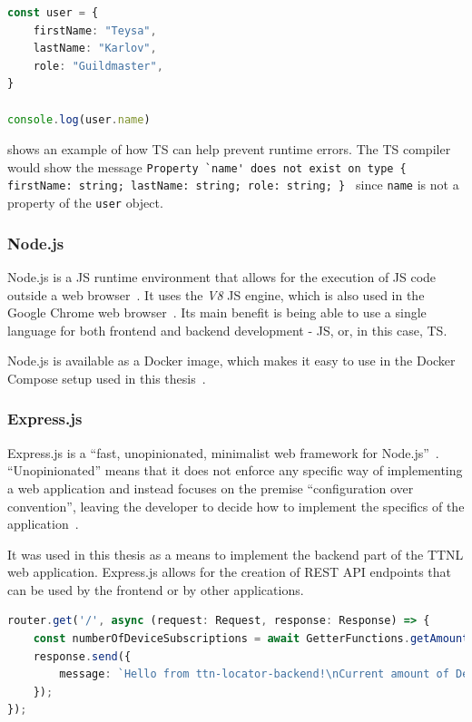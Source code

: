 \begin{lstlisting}[language=TypeScript, float, caption={Example of type checking in \ac{TS}}, label={lst:example-ts-type-checking}]
const user = {
    firstName: "Teysa",
    lastName: "Karlov",
    role: "Guildmaster",
}
    
console.log(user.name)
\end{lstlisting}

 shows an example of how \ac{TS} can help prevent runtime errors.
The \ac{TS} compiler would show the message \lstinline|Property `name' does not exist on type { firstName: string; lastName: string; role: string; } | since \lstinline{name} is not a property of the \lstinline{user} object.

\subsubsection{Node.js}\label{sec:nodejs}

Node.js is a \ac{JS} runtime environment that allows for the execution of \ac{JS} code outside a web browser~\cite{noauthor_nodejs_nodate}.
It uses the \emph{V8} \ac{JS} engine, which is also used in the Google Chrome web browser~\cite{noauthor_v8_nodate}.
Its main benefit is being able to use a single language for both frontend and backend development - \ac{JS}, or, in this case, \ac{TS}.

Node.js is available as a Docker image, which makes it easy to use in the Docker Compose setup used in this thesis~\cite{docker_inc_node_2023}.

\subsubsection{Express.js}

Express.js is a ``fast, unopinionated, minimalist web framework for Node.js''~\cite{noauthor_express_nodate}.
``Unopinionated'' means that it does not enforce any specific way of implementing a web application and instead focuses on the premise ``configuration over convention'', leaving the developer to decide how to implement the specifics of the application~\cite{mardan_pro_2014}.

It was used in this thesis as a means to implement the backend part of the \ac{TTNL} web application.
Express.js allows for the creation of \ac{REST} \ac{API} endpoints that can be used by the frontend or by other applications.

\begin{lstlisting}[language=TypeScript, float, caption={Example of an Express.js \ac{API} endpoint}, label={lst:express-api-endpoint}]
router.get('/', async (request: Request, response: Response) => {
    const numberOfDeviceSubscriptions = await GetterFunctions.getAmountOfDeviceSubscriptions();
    response.send({
        message: `Hello from ttn-locator-backend!\nCurrent amount of Device subscriptions: ${numberOfDeviceSubscriptions}`,
    });
});
\end{lstlisting}

